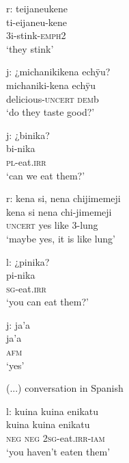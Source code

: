 \ea%
\begingl 
\glpreamble \textup{r:} teijaneukene\\
\gla ti-eijaneu-kene\\ 
\glb 3i-stink-\textsc{emph}2\\ 
\glft ‘they stink’\\ 
\endgl
\xe

\ea%
\begingl 
\glpreamble \textup{j:} ¿michanikikena echÿu?\\
\gla michaniki-kena echÿu\\ 
\glb delicious-\textsc{uncert} \textsc{dem}b\\ 
\glft ‘do they taste good?’\\ 
\endgl
\xe

\ea%
\begingl 
\glpreamble \textup{j:}  ¿binika?\\
\gla bi-nika\\ 
\textsc{pl}-eat.\textsc{irr}\\ 
\glft ‘can we eat them?’\\ 
\endgl
\xe

\ea%
\begingl 
\glpreamble \textup{r:} kena si, nena chijimemeji\\
\gla kena si nena chi-jimemeji\\ 
\glb \textsc{uncert} yes like 3-lung\\ 
\glft ‘maybe yes, it is like lung’\\ 
\endgl
\xe

\ea%
\begingl 
\glpreamble \textup{l:} ¿pinika?\\
\gla pi-nika\\ 
\textsc{sg}-eat.\textsc{irr}\\ 
\glft ‘you can eat them?’\\ 
\endgl
\xe

\ea%
\begingl 
\glpreamble \textup{j:} ja'a\\
\gla ja'a\\ 
\glb \textsc{afm}\\ 
\glft ‘yes’\\ 
\endgl
\xe

(...) conversation in Spanish

\ea%
\begingl 
\glpreamble \textup{l:} kuina kuina enikatu\\
\gla kuina kuina enikatu\\ 
\glb \textsc{neg} \textsc{neg} 2\textsc{sg}-eat.\textsc{irr}-\textsc{iam}\\ 
\glft ‘you haven’t eaten them’\\ 
\endgl
\xe

